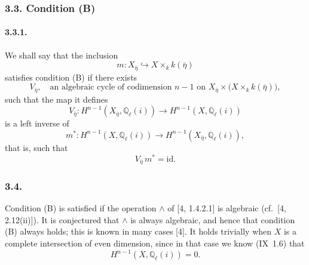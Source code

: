 \subsubsection*{3.3. Condition (B)}

\paragraph{3.3.1.}
We shall say that the inclusion
\begin{equation*}
m:X_{\bar\eta}\hookrightarrow X\times_k k(\bar\eta)
\end{equation*}
satisfies condition (B) if there exists
\begin{equation}\tag{3.3.2}
V_{\bar\eta},\quad
\text{an algebraic cycle of codimension $n-1$ on }
X_{\bar\eta}\times\bigl(X\times_k k(\bar\eta)\bigr),
\end{equation}
such that the map it defines
\begin{equation}\tag{3.3.3}
V_{\bar\eta}:H^{n-1}(X_{\bar\eta},\mathbb Q_\ell(i))
\longrightarrow H^{n-1}(X,\mathbb Q_\ell(i))
\end{equation}
is a left inverse of
\begin{equation}\tag{3.3.4}
m^*:H^{n-1}(X,\mathbb Q_\ell(i))
\longrightarrow H^{n-1}(X_{\bar\eta},\mathbb Q_\ell(i)),
\end{equation}
that is, such that
\begin{equation}\tag{3.3.5}
V_{\bar\eta}\,m^*=\mathrm{id}.
\end{equation}

\subsubsection*{3.4.}
Condition (B) is satisfied if the operation $\wedge$ of [4, 1.4.2.1]
is algebraic (cf.~[4, 2.12(ii)]).  It is conjectured that $\wedge$ is
always algebraic, and hence that condition (B) always holds; this is
known in many cases [4].  It holds trivially when $X$ is a complete
intersection of even dimension, since in that case we know (IX~1.6)
that
\begin{equation}\tag{3.4.1}
H^{n-1}(X,\mathbb Q_\ell(i))=0.
\end{equation}
